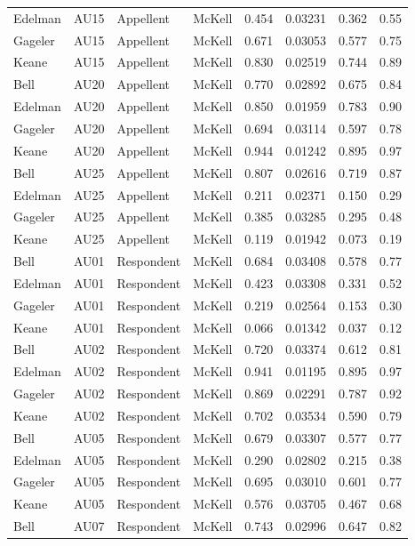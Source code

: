 \documentclass{monashthesis}
\begin{document}
\begin{center}
\begin{longtable}{llllllll}
Edelman & AU15 & Appellent & McKell & 0.454 & 0.03231 & 0.362 & 0.55 \\
Gageler & AU15 & Appellent & McKell & 0.671 & 0.03053 & 0.577 & 0.75 \\
Keane & AU15 & Appellent & McKell & 0.830 & 0.02519 & 0.744 & 0.89 \\
Bell & AU20 & Appellent & McKell & 0.770 & 0.02892 & 0.675 & 0.84 \\
Edelman & AU20 & Appellent & McKell & 0.850 & 0.01959 & 0.783 & 0.90 \\
Gageler & AU20 & Appellent & McKell & 0.694 & 0.03114 & 0.597 & 0.78 \\
Keane & AU20 & Appellent & McKell & 0.944 & 0.01242 & 0.895 & 0.97 \\
Bell & AU25 & Appellent & McKell & 0.807 & 0.02616 & 0.719 & 0.87 \\
Edelman & AU25 & Appellent & McKell & 0.211 & 0.02371 & 0.150 & 0.29 \\
Gageler & AU25 & Appellent & McKell & 0.385 & 0.03285 & 0.295 & 0.48 \\
Keane & AU25 & Appellent & McKell & 0.119 & 0.01942 & 0.073 & 0.19 \\
Bell & AU01 & Respondent & McKell & 0.684 & 0.03408 & 0.578 & 0.77 \\
Edelman & AU01 & Respondent & McKell & 0.423 & 0.03308 & 0.331 & 0.52 \\
Gageler & AU01 & Respondent & McKell & 0.219 & 0.02564 & 0.153 & 0.30 \\
Keane & AU01 & Respondent & McKell & 0.066 & 0.01342 & 0.037 & 0.12 \\
Bell & AU02 & Respondent & McKell & 0.720 & 0.03374 & 0.612 & 0.81 \\
Edelman & AU02 & Respondent & McKell & 0.941 & 0.01195 & 0.895 & 0.97 \\
Gageler & AU02 & Respondent & McKell & 0.869 & 0.02291 & 0.787 & 0.92 \\
Keane & AU02 & Respondent & McKell & 0.702 & 0.03534 & 0.590 & 0.79 \\
Bell & AU05 & Respondent & McKell & 0.679 & 0.03307 & 0.577 & 0.77 \\
Edelman & AU05 & Respondent & McKell & 0.290 & 0.02802 & 0.215 & 0.38 \\
Gageler & AU05 & Respondent & McKell & 0.695 & 0.03010 & 0.601 & 0.77 \\
Keane & AU05 & Respondent & McKell & 0.576 & 0.03705 & 0.467 & 0.68 \\
Bell & AU07 & Respondent & McKell & 0.743 & 0.02996 & 0.647 & 0.82 \\

\end{longtable}
\end{center}
\end{document}

